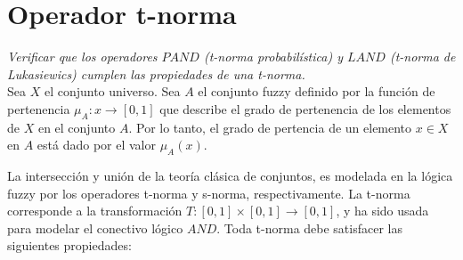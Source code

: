 \documentclass[letterpaper,spanish,11pt]{article}
\begin{document}
\maketitle


\section{Operador t-norma}
\emph{Verificar que los operadores $PAND$ (t-norma probabil\'{i}stica) y $LAND$ (t-norma
de Lukasiewics) cumplen las propiedades de una t-norma.}\\

Sea $X$ el conjunto universo. Sea $A$ el conjunto fuzzy definido por la funci\'{o}n
de pertenencia $\mu_{A}:x \rightarrow [0,1]$ que describe el
grado de pertenencia  de los elementos de $X$ en el conjunto $A$.
Por lo tanto, el grado de pertencia de un elemento $x \in X$ en $A$ est\'{a}
dado por el valor $\mu_{A}(x)$.


La intersecci\'{o}n y uni\'{o}n de la teor\'{i}a cl\'{a}sica de conjuntos, es
modelada en la l\'{o}gica fuzzy por los operadores t-norma y s-norma,
respectivamente. 
La t-norma corresponde a la transformaci\'{o}n $T:[0,1] \times [0,1]
\rightarrow [0,1]$, y ha sido usada para modelar el conectivo l\'{o}gico $AND$. 
Toda t-norma debe satisfacer las siguientes propiedades:

\end{document}
